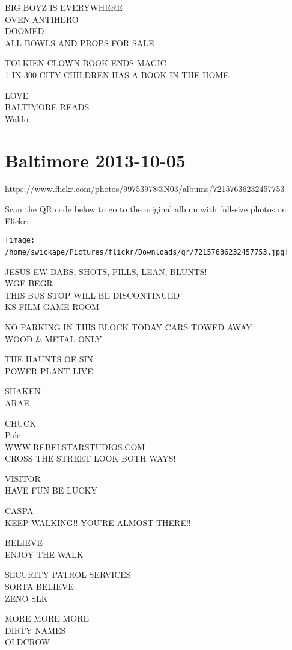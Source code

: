 \documentclass[10pt,letterpaper]{article}
\begin{document}
BIG BOYZ IS EVERYWHERE\\
OVEN ANTIHERO\\
DOOMED\\
ALL BOWLS AND PROPS FOR SALE

TOLKIEN CLOWN BOOK ENDS MAGIC\\
1 IN 300 CITY CHILDREN HAS A BOOK IN THE HOME

LOVE\\
BALTIMORE READS\\
Waldo
\

\section*{Baltimore 2013-10-05}

\url{https://www.flickr.com/photos/99753978@N03/albums/72157636232457753}

Scan the QR code below to go to the original album with full-size photos on Flickr:

\texttt{[image: /home/swickape/Pictures/flickr/Downloads/qr/72157636232457753.jpg]}
\

JESUS EW DABS, SHOTS, PILLS, LEAN, BLUNTS!\\
WGE BEGR\\
THIS BUS STOP WILL BE DISCONTINUED\\
KS FILM GAME ROOM

NO PARKING IN THIS BLOCK TODAY CARS TOWED AWAY\\
WOOD \& METAL ONLY

THE HAUNTS OF SIN\\
POWER PLANT LIVE

SHAKEN\\
ARAE

CHUCK\\
Pole\\
WWW.REBELSTARSTUDIOS.COM\\
CROSS THE STREET LOOK BOTH WAYS!

VISITOR\\
HAVE FUN BE LUCKY

CASPA\\
KEEP WALKING!! YOU'RE ALMOST THERE!!

BELIEVE\\
ENJOY THE WALK

SECURITY PATROL SERVICES\\
SORTA BELIEVE\\
ZENO SLK

MORE MORE MORE\\
DIRTY NAMES\\
OLDCROW
\end{document}
